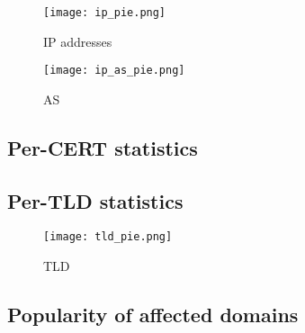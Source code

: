 \begin{figure}[!hbt]
\centering
\texttt{[image: ip\_pie.png]}
\caption{IP addresses}
\label{fig:ip_pie}
\end{figure}

\begin{figure}[!hbt]
\centering
\texttt{[image: ip\_as\_pie.png]}
\caption{AS}
\label{fig:ip_as_pie}
\end{figure}

\subsection{Per-CERT statistics}
\subsection{Per-TLD statistics}

\begin{figure}[!hbt]
\centering
\texttt{[image: tld\_pie.png]}
\caption{TLD}
\label{fig:tld_pie}
\end{figure}

\subsection{Popularity of affected domains}
